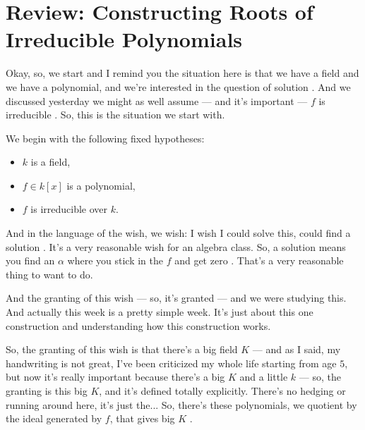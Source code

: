 \section{Review: Constructing Roots of Irreducible Polynomials}

\begin{speech}[00:00:00 - 00:00:29]
Okay, so, we start and I remind you the situation here is that we have a field and we have a polynomial, and we're interested in the question of solution . And we discussed yesterday we might as well assume --- and it's important --- $f$ is irreducible . So, this is the situation we start with.
\end{speech}

\begin{content}
We begin with the following fixed hypotheses:
\begin{itemize}
    \item $k$ is a field,
    \item $f \in k[x]$ is a polynomial,
    \item $f$ is irreducible over $k$.
\end{itemize}
\end{content}

\begin{speech}[00:00:30 - 00:01:46]
And in the language of the wish, we wish: I wish I could solve this, could find a solution . It's a very reasonable wish for an algebra class. So, a solution means you find an $\alpha$ where you stick in the $f$ and get zero . That's a very reasonable thing to want to do.

And the granting of this wish --- so, it's granted  --- and we were studying this. And actually this week is a pretty simple week. It's just about this one construction and understanding how this construction works.

So, the granting of this wish is that there's a big field $K$  --- and as I said, my handwriting is not great, I've been criticized my whole life starting from age $5$, but now it's really important because there's a big $K$ and a little $k$  --- so, the granting is this big $K$, and it's defined totally explicitly. There's no hedging or running around here, it's just the... So, there's these polynomials, we quotient by the ideal generated by $f$, that gives big $K$ .
\end{speech}

